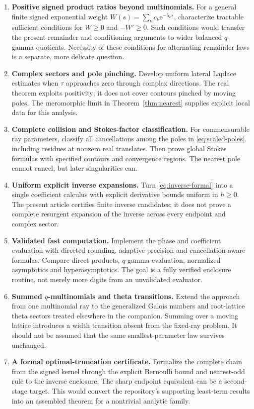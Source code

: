 \documentclass[11pt,a4paper]{article}
\numberwithin{equation}{section}
\theoremstyle{definition}\newtheorem{definition}[theorem]{Definition}
\theoremstyle{remark}\newtheorem{remark}[theorem]{Remark}
\newcommand{\e}{\mathrm e}
\begin{document}
\begin{enumerate}[leftmargin=*,label=\textbf{Q\arabic*.},itemsep=6pt]
\item \textbf{Positive signed product ratios beyond multinomials.}
For a general finite signed exponential weight
$W(s)=\sum_\nu c_\nu\e^{-\lambda_\nu s}$, characterize tractable sufficient
conditions for $W\ge0$ and $-W'\ge0$. Such conditions would transfer the
present remainder and conditioning arguments to wider balanced
$q$-gamma quotients. Necessity of these conditions for alternating remainder
laws is a separate, more delicate question.

\item \textbf{Complex sectors and pole pinching.}
Develop uniform lateral Laplace estimates when $\tau$ approaches zero through
complex directions. The real theorem exploits positivity; it does not cover
contours pinched by moving poles. The meromorphic limit in
Theorem~\ref{thm:nearest} supplies explicit local data for this analysis.

\item \textbf{Complete collision and Stokes-factor classification.}
For commensurable ray parameters, classify all cancellations among the poles
in \eqref{eq:scaled-poles}, including residues at nonzero real translates.
Then prove global Stokes formulas with specified contours and convergence
regions. The nearest pole cannot cancel, but later singularities can.

\item \textbf{Uniform explicit inverse expansions.}
Turn \eqref{eq:inverse-formal} into a single coefficient calculus with
explicit derivative bounds uniform in $h\ge0$. The present article certifies
finite inverse candidates; it does not prove a complete resurgent expansion
of the inverse across every endpoint and complex sector.

\item \textbf{Validated fast computation.}
Implement the phase and coefficient evaluation with directed rounding,
adaptive precision and cancellation-aware formulas. Compare direct products,
$q$-gamma evaluation, normalized asymptotics and hyperasymptotics. The goal
is a fully verified enclosure routine, not merely more digits from an
unvalidated evaluator.

\item \textbf{Summed $q$-multinomials and theta transitions.}
Extend the approach from one multinomial ray to the generalized Galois
numbers and root-lattice theta sectors treated elsewhere in the companion.
Summing over a moving lattice introduces a width transition absent from the
fixed-ray problem. It should not be assumed that the same smallest-parameter
law survives unchanged.

\item \textbf{A formal optimal-truncation certificate.}
Formalize the complete chain from the signed kernel through the explicit
Bernoulli bound and nearest-odd rule to the inverse enclosure. The sharp
endpoint equivalent can be a second-stage target. This would convert the
repository's supporting least-term results into an assembled theorem for a
nontrivial analytic family.
\end{enumerate}
\end{document}

